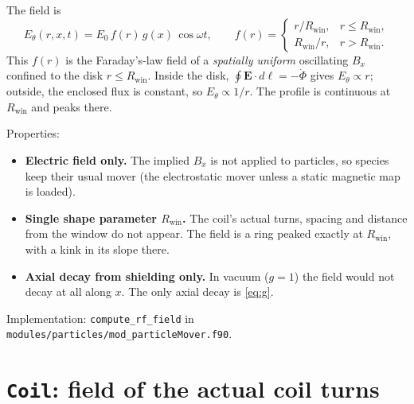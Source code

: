 \documentclass[11pt,a4paper]{article}
\newcommand{\rwin}{R_{\mathrm{win}}}
\newcommand{\code}[1]{\texttt{#1}}
\begin{document}
The field is
\begin{equation}
  E_\theta(r,x,t) = E_0\, f(r)\, g(x)\, \cos\omega t, \qquad
  f(r) =
  \begin{cases}
    r/\rwin, & r \le \rwin,\\[2pt]
    \rwin/r, & r > \rwin.
  \end{cases}
  \label{eq:planar}
\end{equation}
This $f(r)$ is the Faraday's-law field of a \emph{spatially uniform}
oscillating $B_x$ confined to the disk $r\le\rwin$. Inside the disk,
$\oint \mathbf{E}\cdot d\boldsymbol{\ell} = -\dot\Phi$ gives
$E_\theta \propto r$; outside, the enclosed flux is constant, so
$E_\theta \propto 1/r$. The profile is continuous at $\rwin$ and peaks
there.

Properties:
\begin{itemize}
  \item \textbf{Electric field only.} The implied $B_x$ is not applied to
        particles, so species keep their usual mover (the electrostatic
        mover unless a static magnetic map is loaded).
  \item \textbf{Single shape parameter $\rwin$.} The coil's actual turns,
        spacing and distance from the window do not appear. The field is a
        ring peaked exactly at $\rwin$, with a kink in its slope there.
  \item \textbf{Axial decay from shielding only.} In vacuum ($g=1$) the field
        would not decay at all along $x$. The only axial decay is
        \eqref{eq:g}.
\end{itemize}
Implementation: \code{compute\_rf\_field} in
\code{modules/particles/mod\_particleMover.f90}.

\section{\texttt{Coil}: field of the actual coil turns}
\end{document}

